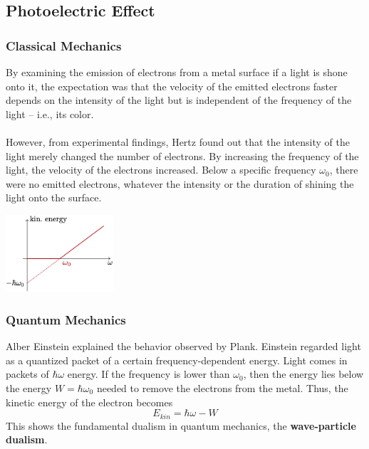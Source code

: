 \documentclass{article}
\begin{document}
\subsection{Photoelectric Effect}
\subsubsection{Classical Mechanics}
By examining the emission of electrons from a metal surface if a light is shone onto it, the expectation was that the velocity of the emitted electrons faster depends on the intensity of the light but is independent of the frequency of the light --  i.e., its color. \\ \\
However, from experimental findings, Hertz found out that the intensity of the light merely changed the number of electrons. By increasing the frequency of the light, the velocity of the electrons increased. Below a specific frequency $\omega_0$, there were no emitted electrons, whatever the intensity or the duration of shining the light onto the surface.

\begin{center}
	\includegraphics[width=4cm]{assets/photoelectric.png}
\end{center}

\subsubsection{Quantum Mechanics}
Alber Einstein explained the behavior observed by Plank. Einstein regarded light as a quantized packet of a certain frequency-dependent energy. Light comes in packets of $\hbar \omega$ energy. If the frequency is lower than $\omega_0$, then the energy lies below the energy $W = \hbar\omega_0$ needed to remove the electrons from the metal. Thus, the kinetic energy of the electron becomes
\[ E_{kin} = \hbar \omega - W \]
This shows the fundamental dualism in quantum mechanics, the \textbf{wave-particle dualism}.
\end{document}
